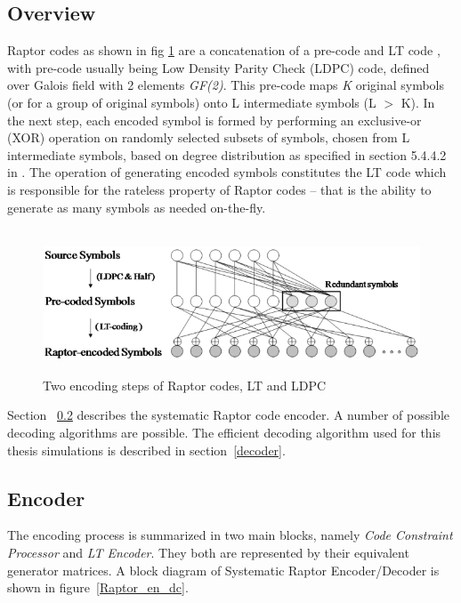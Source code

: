 \subsection{Overview}
Raptor codes as shown in fig \ref{overview} are a concatenation of a pre-code and LT code \cite{khisti2003tornado}, with pre-code usually being Low Density Parity Check (LDPC) \cite{gallager1962low} code, defined over Galois field with 2 elements \textit{GF(2)}. This pre-code maps \textit{K} original symbols (or for a group of original symbols) onto L intermediate symbols (L $>$ K). In the next step, each encoded symbol is formed by performing an exclusive-or (XOR) operation on randomly selected subsets of symbols, chosen from L intermediate symbols, based on degree distribution as specified in section 5.4.4.2 in \cite{luby2007rfc}. The operation of generating encoded symbols constitutes the LT code which is responsible for the rateless property of Raptor codes -- that is the ability to generate as many symbols as needed on-the-fly.
\\
\begin{figure}[htbp]
\begin{center}
\mbox{
\includegraphics[width=5.2in]{Figures/overview}}
\caption{Two encoding steps of Raptor codes, LT and LDPC \cite{ha2017block}}
\label{overview}
\end{center}
\end{figure}
\par
Section ~\ref{encoder} describes the systematic Raptor code encoder. A number of possible decoding algorithms are possible. The efficient decoding algorithm used for this thesis simulations is described in section~\ref{decoder}.

\subsection{Encoder} \label{encoder}

The encoding process is summarized in two main blocks, namely \textit{Code Constraint Processor} and \textit{LT Encoder}. They both are represented by their equivalent generator matrices. A block diagram of Systematic Raptor Encoder/Decoder is shown in figure~\ref{Raptor_en_dc}.

